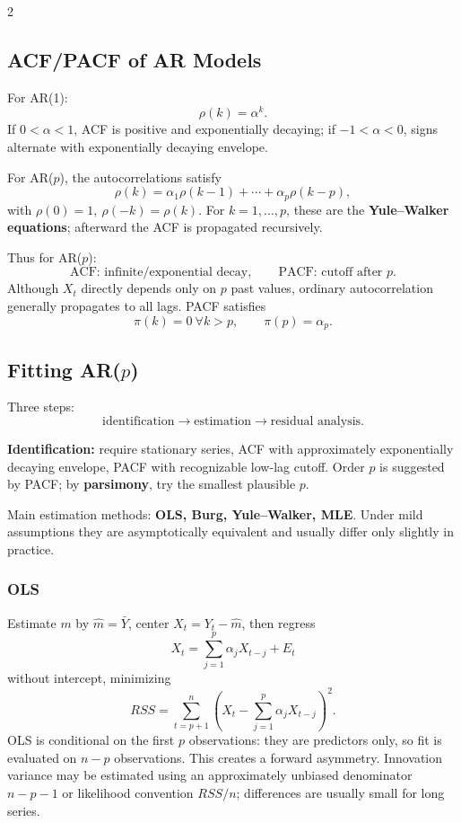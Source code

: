 \documentclass[9pt,a4paper]{extarticle}
\newcommand{\key}[1]{\textbf{#1}}
\begin{document}
\begin{multicols}{2}
\subsection{ACF/PACF of AR Models}

For AR(1):
\[
\boxed{\rho(k)=\alpha^k}.
\]
If \(0<\alpha<1\), ACF is positive and exponentially decaying; if \(-1<\alpha<0\), signs alternate with exponentially decaying envelope.

For AR($p$), the autocorrelations satisfy
\[
\boxed{\rho(k)=\alpha_1\rho(k-1)+\cdots+\alpha_p\rho(k-p)},
\]
with \(\rho(0)=1,\ \rho(-k)=\rho(k)\). For \(k=1,\ldots,p\), these are the \key{Yule--Walker equations}; afterward the ACF is propagated recursively.

Thus for AR($p$):
\[
\boxed{\text{ACF: infinite/exponential decay},\qquad
\text{PACF: cutoff after }p.}
\]
Although \(X_t\) directly depends only on \(p\) past values, ordinary autocorrelation generally propagates to all lags. PACF satisfies
\[
\boxed{\pi(k)=0\ \forall k>p},\qquad \boxed{\pi(p)=\alpha_p}.
\]

\subsection{Fitting AR($p$)}

Three steps:
\[
\boxed{\text{identification}\rightarrow\text{estimation}\rightarrow\text{residual analysis}.}
\]

\key{Identification:} require stationary series, ACF with approximately exponentially decaying envelope, PACF with recognizable low-lag cutoff. Order \(p\) is suggested by PACF; by \key{parsimony}, try the smallest plausible \(p\).

Main estimation methods: \key{OLS, Burg, Yule--Walker, MLE}. Under mild assumptions they are asymptotically equivalent and usually differ only slightly in practice.

\subsubsection*{OLS}

Estimate \(m\) by \(\widehat m=\bar Y\), center \(X_t=Y_t-\widehat m\), then regress
\[
X_t=\sum_{j=1}^p\alpha_jX_{t-j}+E_t
\]
without intercept, minimizing
\[
\boxed{RSS=\sum_{t=p+1}^n\left(X_t-\sum_{j=1}^p\alpha_jX_{t-j}\right)^2.}
\]
OLS is conditional on the first \(p\) observations: they are predictors only, so fit is evaluated on \(n-p\) observations. This creates a forward asymmetry. Innovation variance may be estimated using an approximately unbiased denominator \(n-p-1\) or likelihood convention \(RSS/n\); differences are usually small for long series.


\end{multicols}
\end{document}
